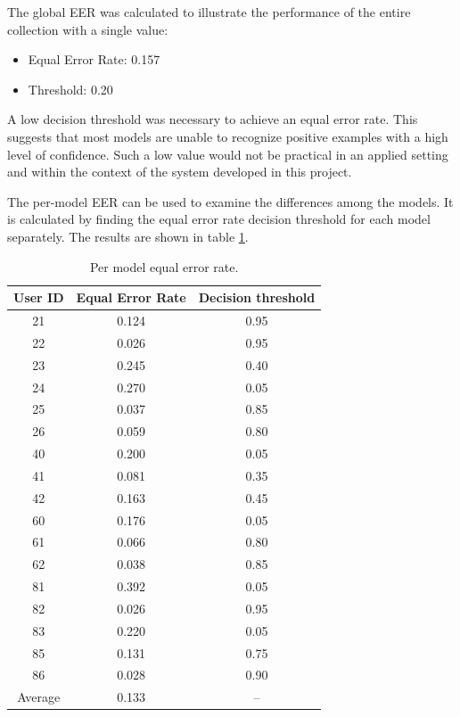 The global EER was calculated to illustrate the performance of the entire collection with a single value:
\begin{itemize}
	\item Equal Error Rate: 0.157
	\item Threshold: 0.20
\end{itemize}
A low decision threshold was necessary to achieve an equal error rate. This suggests that most models are unable to recognize positive examples with a high level of confidence. Such a low value would not be practical in an applied setting and within the context of the system developed in this project. 

The per-model EER can be used to examine the differences among the models.
It is calculated by finding the equal error rate decision threshold for each model separately.
The results are shown in table \ref{table:EER_separate}.
\begin{center}
	\begin{table}[H]
		\begin{center}
			\begin{tabular}{ |c|c|c| } 
				\hline
				User ID & Equal Error Rate & Decision threshold \\
				\hline
				21 & 0.124 & 0.95 \\
				\hline
				22 & 0.026 & 0.95 \\
				\hline
				23 & 0.245 & 0.40 \\
				\hline
				24 & 0.270 & 0.05 \\
				\hline
				25 & 0.037 & 0.85 \\
				\hline
				26 & 0.059 & 0.80 \\
				\hline
				40 & 0.200 & 0.05 \\
				\hline
				41 & 0.081 & 0.35 \\
				\hline
				42 & 0.163 & 0.45 \\
				\hline
				60 & 0.176 & 0.05 \\
				\hline
				61 & 0.066 & 0.80 \\
				\hline
				62 & 0.038 & 0.85 \\
				\hline
				81 & 0.392 & 0.05 \\
				\hline
				82 & 0.026 & 0.95 \\
				\hline
				83 & 0.220 & 0.05 \\
				\hline
				85 & 0.131 & 0.75 \\
				\hline
				86 & 0.028 & 0.90 \\
				\hline
				Average & 0.133 & -- \\
				\hline
			\end{tabular}
		\end{center}
		\caption{Per model equal error rate.}
		\label{table:EER_separate}
	\end{table}
\end{center}

